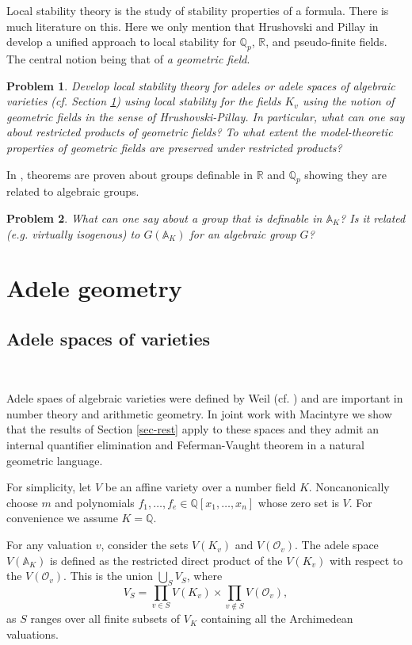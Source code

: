 \documentclass[12pt]{amsart}
\def\A{\mathbb{A}}
\def\R{\mathbb{R}}
\def\R{\mathbb{R}}
\def\Q{\mathbb{Q}}
\def\cO{\mathcal{O}}
\numberwithin{equation}{section}
\newtheorem{prob}{Problem}[section]
\begin{document}
Local stability theory is the study of stability properties of a formula. There is much literature on this. Here we only mention that Hrushovski and Pillay in \cite{udi-pillay-groups} develop a 
unified approach to local stability for $\Q_p$, $\R$, and pseudo-finite fields. The central notion being that of {\it a geometric field}. 
\begin{prob} Develop local stability theory for adeles or adele spaces of algebraic varieties (cf. Section \ref{sec-adgeom}) using local stability for the fields $K_v$ using the notion of geometric fields in the sense of Hrushovski-Pillay. In particular, what can one say about 
restricted products of geometric fields? To what extent the model-theoretic properties of geometric fields are preserved under restricted products?\end{prob}
In \cite{udi-pillay-groups}, theorems are proven about groups definable in $\R$ and $\Q_p$ showing they are related to algebraic groups. 
\begin{prob} What can one say about a group that is definable in $\A_K$? Is it related (e.g. virtually isogenous) to $G(\A_K)$ for an algebraic group $G$?\end{prob}

\section{\bf Adele geometry}\label{sec-adgeom}

\medskip

\subsection{\bf Adele spaces of varieties}\label{ssec-adsp} 

\

\medskip

Adele spaes of algebraic varieties were defined by Weil (cf. \cite{weil-adeles-gps}) and are important in number theory and arithmetic geometry. 
In joint work with Macintyre \cite{DM-ad} we show that the results of Section \ref{sec-rest} apply to these spaces and they admit an internal quantifier elimination and Feferman-Vaught theorem in a natural geometric language.

For simplicity, let $V$ be an affine variety over a number field $K$. Noncanonically 
choose $m$ and polynomials $f_1,\dots,f_e \in \Q[x_1,\dots,x_n]$ whose zero set is $V$. For convenience we assume 
$K=\Q$. 

For any valuation $v$, consider the sets $V(K_v)$ and $V(\cO_v)$. The adele space $V(\A_K)$ is defined as 
the restricted direct product of the $V(K_v)$ with respect to the $V(\cO_v)$. This is the union $\bigcup_{S} V_S$, where
$$V_S=\prod_{v\in S} V(K_v) \times \prod_{v\notin S} V(\mathcal{O}_v),$$
as $S$ ranges over all finite subsets of $V_K$ containing all the Archimedean valuations. 
\end{document}
